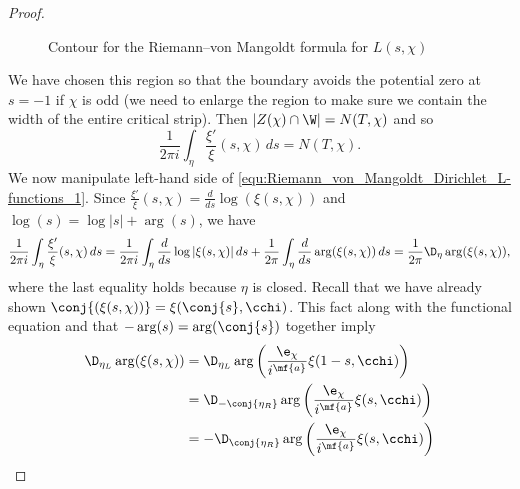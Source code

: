 \begin{proof}
\begin{figure}[ht]
          \caption{Contour for the Riemann–von Mangoldt formula for $L(s,\chi)$}
          \label{fig:Riemann_von_Mangoldt_Dirichlet_L-function_contour}
        \end{figure}
        
        We have chosen this region so that the boundary avoids the potential zero at $s = -1$ if $\chi$ is odd (we need to enlarge the region to make sure we contain the width of the entire critical strip). Then $|Z(\chi) \cap \W| = N(T,\chi)$ and so
        \begin{equation}\label{equ:Riemann_von_Mangoldt_Dirichlet_L-functions_1}
          \frac{1}{2\pi i}\int_{\eta}\frac{\xi'}{\xi}(s,\chi)\,ds = N(T,\chi).
        \end{equation}
        We now manipulate left-hand side of \cref{equ:Riemann_von_Mangoldt_Dirichlet_L-functions_1}. Since $\frac{\xi'}{\xi}(s,\chi) = \frac{d}{ds}\log(\xi(s,\chi))$ and $\log(s) = \log|s|+\arg(s)$, we have
        \begin{equation}\label{equ:Riemann_von_Mangoldt_Dirichlet_L-functions_2}
          \frac{1}{2\pi i}\int_{\eta}\frac{\xi'}{\xi}(s,\chi)\,ds = \frac{1}{2\pi i}\int_{\eta}\frac{d}{ds}\log|\xi(s,\chi)|\,ds+\frac{1}{2\pi }\int_{\eta}\frac{d}{ds}\arg(\xi(s,\chi))\,ds = \frac{1}{2\pi}\D_{\eta}\arg(\xi(s,\chi)),
        \end{equation}
        where the last equality holds because $\eta$ is closed. Recall that we have already shown $\conj{(\xi(s,\chi))} = \xi(\conj{s},\cchi)$. This fact along with the functional equation and that $-\arg(s) = \arg(\conj{s})$ together imply
        \begin{align*}
          \D_{\eta_{L}}\arg(\xi(s,\chi)) &= \D_{\eta_{L}}\arg\left(\frac{\e_{\chi}}{i^{\mf{a}}}\xi(1-s,\cchi)\right) \\
          &= \D_{-\conj{\eta_{R}}}\arg\left(\frac{\e_{\chi}}{i^{\mf{a}}}\xi(s,\cchi)\right) \\
          &= -\D_{\conj{\eta_{R}}}\arg\left(\frac{\e_{\chi}}{i^{\mf{a}}}\xi(s,\cchi)\right) \\

\end{align*}
\end{proof}
